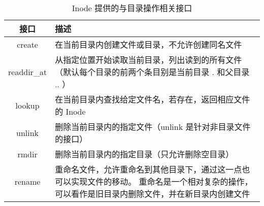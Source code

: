 \begin{table}[h]
    \centering
    \begin{tabularx}{\textwidth}{|c|Y|}
    \hline
    接口 & 描述 \\
    \hline
    create & 在当前目录内创建文件或目录，不允许创建同名文件\\
    \hline
    readdir\_at & 从指定位置开始读取当前目录，列出读到的所有文件
    （默认每个目录的前两个条目别是当前目录 . 和父目录 .. ）\\
    \hline
    lookup & 在当前目录内查找给定文件名，若存在，返回相应文件的 Inode\\
    \hline
    unlink & 删除当前目录内的指定文件（unlink 是针对非目录文件的接口）\\
    \hline
    rmdir & 删除当前目录内的指定目录（只允许删除空目录）\\
    \hline
    rename & 重命名文件，允许重命名到其他目录下，通过这一点也可以实现文件的移动。
    重命名是一个相对复杂的操作，可以看作是旧目录内删除文件，并在新目录内创建文件\\
    \hline
    \end{tabularx}
    \caption{Inode 提供的与目录操作相关接口}
    \label{tab:dir}
\end{table}
